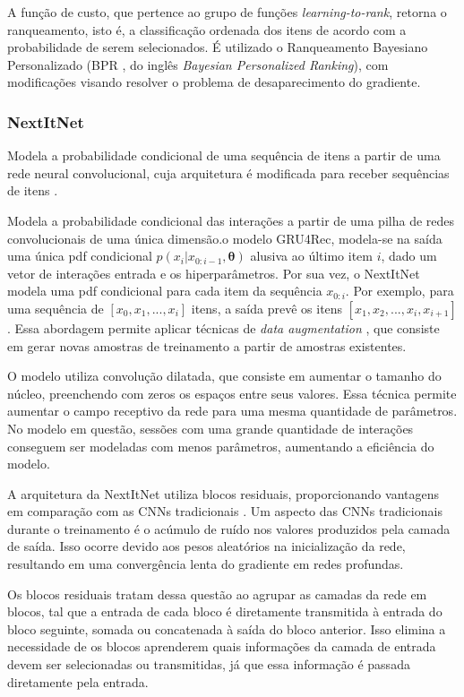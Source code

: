 A função de custo, que pertence ao grupo de funções \textit{learning-to-rank},
retorna o ranqueamento, isto é, a classificação ordenada dos itens de acordo com
a probabilidade de serem selecionados. É utilizado o Ranqueamento Bayesiano
Personalizado (BPR \cite{rendle2009}, do inglês \textit{Bayesian Personalized
Ranking}), com modificações visando resolver o problema de desaparecimento do
gradiente. 

\subsubsection{NextItNet}
Modela a probabilidade condicional de uma sequência de itens a partir de uma
rede neural convolucional, cuja arquitetura é modificada para receber sequências de
itens \cite{nextitnet}.

Modela a probabilidade condicional das interações a partir de uma pilha de redes
convolucionais de uma única dimensão.o modelo GRU4Rec, modela-se na
saída uma única pdf condicional $p(x_i|x_{0:i-1}, \mathbf{\theta})$ alusiva ao
último item $i$, dado um vetor de interações entrada e os hiperparâmetros. Por
sua vez, o NextItNet modela uma pdf condicional para cada item da sequência
$x_{0:i}$. Por exemplo, para uma sequência de $[x_0, x_1, ..., x_i]$ itens, a
saída prevê os itens $[x_1, x_2, ..., x_i, x_{i+1}]$. Essa abordagem permite
aplicar técnicas de \textit{data augmentation} \cite{tan2016improved}, que
consiste em gerar novas amostras de treinamento a partir de amostras existentes.

O modelo utiliza convolução dilatada, que consiste em aumentar o tamanho do
núcleo, preenchendo com zeros os espaços entre seus valores. Essa técnica
permite aumentar o campo receptivo da rede para uma mesma quantidade de
parâmetros. No modelo em questão, sessões com uma grande quantidade de
interações conseguem ser modeladas com menos parâmetros, aumentando a eficiência
do modelo.

A arquitetura da NextItNet utiliza blocos residuais, proporcionando vantagens em
comparação com as CNNs tradicionais \cite{he2016deep}. Um aspecto das CNNs
tradicionais durante o treinamento é o acúmulo de ruído nos valores produzidos
pela camada de saída. Isso ocorre devido aos pesos aleatórios na inicialização
da rede, resultando em uma convergência lenta do gradiente em redes profundas.

Os blocos residuais tratam dessa questão ao agrupar as camadas da rede em
blocos, tal que a entrada de cada bloco é diretamente transmitida à entrada do
bloco seguinte, somada ou concatenada à saída do bloco anterior. Isso elimina a
necessidade de os blocos aprenderem quais informações da camada de entrada devem
ser selecionadas ou transmitidas, já que essa informação é passada diretamente
pela entrada.

